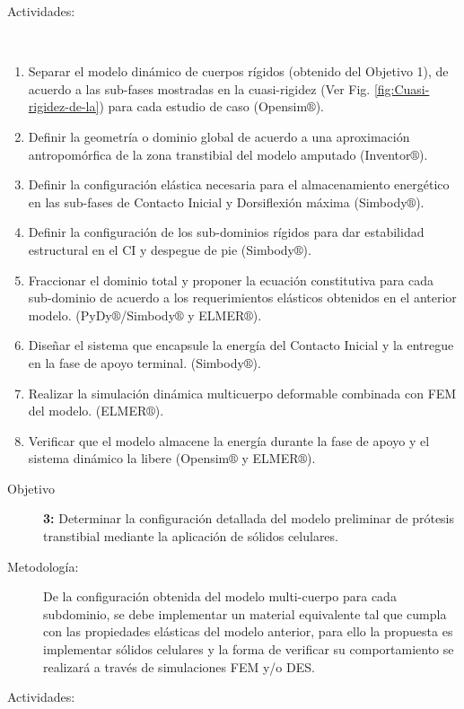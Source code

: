 \documentclass[12pt,english]{article}
\begin{document}
\begin{description}
\item [{Actividades:}]~\end{description}
\begin{enumerate}
\item Separar el modelo dinámico de cuerpos rígidos (obtenido del Objetivo 1), de acuerdo a las sub-fases mostradas en la cuasi-rigidez (Ver Fig. \ref{fig:Cuasi-rigidez-de-la}) para cada estudio de caso (Opensim$\circledR$).
\item Definir la geometría o dominio global de acuerdo a una aproximación
antropomórfica de la zona transtibial del modelo amputado (Inventor$\circledR$).
\item Definir la configuración elástica necesaria para el almacenamiento energético en las sub-fases de Contacto Inicial y Dorsiflexión máxima (Simbody$\circledR$).
\item Definir la configuración de los sub-dominios rígidos para dar estabilidad estructural en el CI y despegue de pie (Simbody$\circledR$).
\item Fraccionar el dominio total y proponer la ecuación constitutiva para cada sub-dominio de acuerdo a los requerimientos elásticos obtenidos en el anterior modelo. (PyDy$\circledR$/Simbody$\circledR$ y ELMER$\circledR$).
\item Diseñar el sistema que encapsule la energía del Contacto
Inicial y la entregue en la fase de apoyo terminal. (Simbody$\circledR$).
\item Realizar la simulación dinámica multicuerpo deformable combinada con FEM del modelo. (ELMER$\circledR$).
\item Verificar que el modelo almacene la energía durante la fase de apoyo
y el sistema dinámico la libere (Opensim$\circledR$ y ELMER$\circledR$).\end{enumerate}
\begin{description}
\item [{Objetivo}]  \textbf{ 3: }Determinar la configuración detallada del modelo preliminar de prótesis transtibial mediante la aplicación de sólidos celulares.
\item [{Metodología:}] De la configuración obtenida del modelo multi-cuerpo para cada subdominio, se debe implementar un material equivalente tal
que cumpla con las propiedades elásticas del modelo anterior, para
ello la propuesta es implementar sólidos celulares y la forma de verificar
su comportamiento se realizará a través de simulaciones FEM y/o DES.
\item [{Actividades:}]~\end{description}
\end{document}
